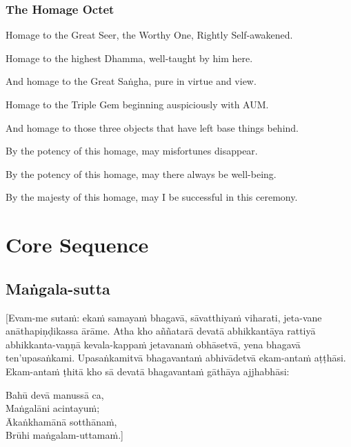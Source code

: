 \subsubsection{The Homage Octet}

Homage to the Great Seer, the Worthy One, Rightly Self-awakened.

Homage to the highest Dhamma, well-taught by him here.

And homage to the Great Saṅgha, pure in virtue and view.

Homage to the Triple Gem beginning auspiciously with AUM.

And homage to those three objects that have left base things behind.

By the potency of this homage, may misfortunes disappear.

By the potency of this homage, may there always be well-being.

By the majesty of this homage, may I be successful in this ceremony.

\section{Core Sequence}

\subsection{Maṅgala-sutta}
\label{asevana}

[Evam-me sutaṁ: ekaṁ samayaṁ bhagavā, sāvatthiyaṁ viharati, jeta-vane
anāthapiṇḍikassa ārāme. Atha kho aññatarā devatā abhikkantāya rattiyā
abhikkanta-vaṇṇā kevala-kappaṁ jetavanaṁ obhāsetvā, yena bhagavā ten'upasaṅkami.
Upasaṅkamitvā bhagavantaṁ abhivādetvā ekam-antaṁ aṭṭhāsi. Ekam-antaṁ ṭhitā kho
sā devatā bhagavantaṁ gāthāya ajjhabhāsi:

Bahū devā manussā ca,\\
Maṅgalāni acintayuṁ;\\
Ākaṅkhamānā sotthānaṁ,\\
Brūhi maṅgalam-uttamaṁ.]

\bigskip


